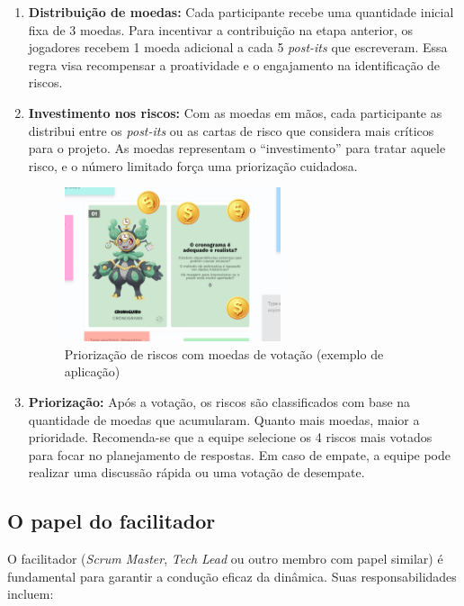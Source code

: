 \documentclass[
	12pt,
	openright,
	twoside,
	a4paper,
	english,
	brazil
	]{abntex2}
\begin{document}
\begin{enumerate}
  \item \textbf{Distribuição de moedas:} Cada participante recebe uma quantidade inicial fixa de 3 moedas. Para incentivar a contribuição na etapa anterior, os jogadores recebem 1 moeda adicional a cada 5 \textit{post-its} que escreveram. Essa regra visa recompensar a proatividade e o engajamento na identificação de riscos.
  \item \textbf{Investimento nos riscos:} Com as moedas em mãos, cada participante as distribui entre os \textit{post-its} ou as cartas de risco que considera mais críticos para o projeto. As moedas representam o “investimento” para tratar aquele risco, e o número limitado força uma priorização cuidadosa.
  \begin{figure}[H]
      \centering
      \caption{\label{votacao-moedas} Priorização de riscos com moedas de votação (exemplo de aplicação)}
      \includegraphics[width=0.6\textwidth]{votacao-moedas}
  \end{figure}

  \item \textbf{Priorização:} Após a votação, os riscos são classificados com base na quantidade de moedas que acumularam. Quanto mais moedas, maior a prioridade. Recomenda-se que a equipe selecione os 4 riscos mais votados para focar no planejamento de respostas. Em caso de empate, a equipe pode realizar uma discussão rápida ou uma votação de desempate.
\end{enumerate}

\subsection{O papel do facilitador}

O facilitador (\textit{Scrum Master}, \textit{Tech Lead} ou outro membro com papel similar) é fundamental para garantir a condução eficaz da dinâmica. Suas responsabilidades incluem:
\end{document}
